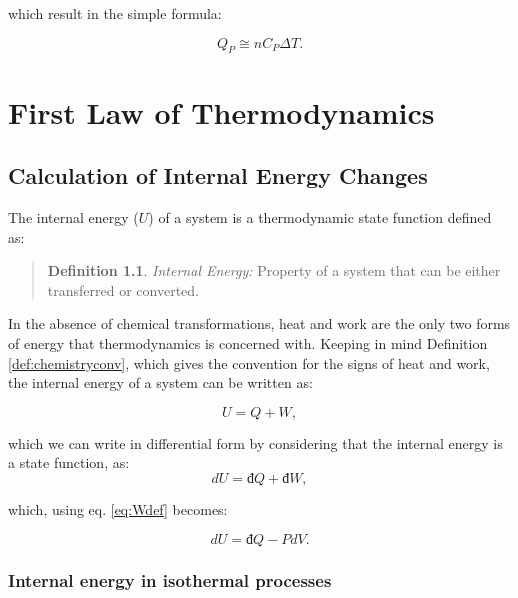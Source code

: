 \documentclass[
  9pt,
]{extbook}
\theoremstyle{definition}
\newtheorem{definition}{Definition}[chapter]
\theoremstyle{definition}
\theoremstyle{definition}
\theoremstyle{remark}
\begin{document}
which result in the simple formula:

\begin{equation}
  Q_P \cong n C_P \Delta T.
  \label{eq:Cpint}
\end{equation}

\hypertarget{FirstLaw}{%
\chapter{First Law of Thermodynamics}\label{FirstLaw}}

\hypertarget{energyint}{%
\section{Calculation of Internal Energy Changes}\label{energyint}}

The internal energy (\(U\)) of a system is a thermodynamic state function defined as:

\begin{quote}
\begin{definition}
\protect\hypertarget{def:energy}{}{\label{def:energy} }\emph{Internal Energy:} Property of a system that can be either transferred or converted.
\end{definition}
\end{quote}

In the absence of chemical transformations, heat and work are the only two forms of energy that thermodynamics is concerned with. Keeping in mind Definition \ref{def:chemistryconv}, which gives the convention for the signs of heat and work, the internal energy of a system can be written as:

\begin{equation}
  U = Q + W,
  \label{eq:U}
\end{equation}

which we can write in differential form by considering that the internal energy is a state function, as:
\begin{equation}
  dU = đ Q + đ W,
  \label{eq:dU}
\end{equation}

which, using eq. \eqref{eq:Wdef} becomes:

\begin{equation}
  dU = đ Q - PdV.
  \label{eq:dUpdv}
\end{equation}

\hypertarget{isothermalE}{%
\subsection{Internal energy in isothermal processes}\label{isothermalE}}
\end{document}
